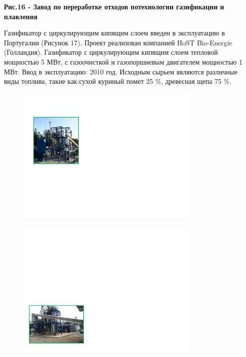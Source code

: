 {\bfseries Рис.16 - Завод по переработке отходов потехнологии газификации
и плавления}

Газификатор с циркулирующим кипящим слоем введен в эксплуатацию в
Португалии (Рисунок 17). Проект реализован компанией HoST Bio-Energie
(Голландия). Газификатор с циркулирующим кипящим слоем тепловой
мощностью 5 МВт, с газоочисткой и газопоршневым двигателем мощностью 1
МВт. Ввод в эксплуатацию: 2010 год. Исходным сырьем являются различные
виды топлива, такие как:сухой куриный помет 25 \%, древесная щепа 75 \%.

\begin{figure}[H]
	\centering
	\includegraphics[width=0.8\textwidth]{media/chem2/image80}
	\caption*{}
\end{figure}

\begin{figure}[H]
	\centering
	\includegraphics[width=0.8\textwidth]{media/chem2/image81}
	\caption*{}
\end{figure}

